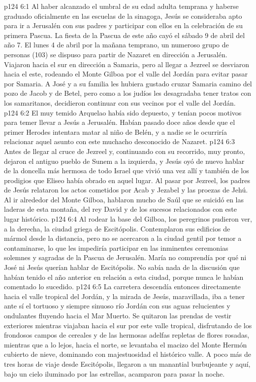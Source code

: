 \vs p124 6:1 Al haber alcanzado el umbral de su edad adulta temprana y haberse graduado oficialmente en las escuelas de la sinagoga, Jesús se consideraba apto para ir a Jerusalén con sus padres y participar con ellos en la celebración de su primera Pascua. La fiesta de la Pascua de este año cayó el sábado 9 de abril del año 7. El lunes 4 de abril por la mañana temprano, un numeroso grupo de personas (103) se dispuso para partir de Nazaret en dirección a Jerusalén. Viajaron hacia el sur en dirección a Samaria, pero al llegar a Jezreel se desviaron hacia el este, rodeando el Monte Gilboa por el valle del Jordán para evitar pasar por Samaria. A José y a su familia les hubiera gustado cruzar Samaria camino del pozo de Jacob y de Betel, pero como a los judíos les desagradaba tener tratos con los samaritanos, decidieron continuar con sus vecinos por el valle del Jordán.
\vs p124 6:2 El muy temido Arquelao había sido depuesto, y tenían pocos motivos para temer llevar a Jesús a Jerusalén. Habían pasado doce años desde que el primer Herodes intentara matar al niño de Belén, y a nadie se le ocurriría relacionar aquel asunto con este muchacho desconocido de Nazaret.
\vs p124 6:3 Antes de llegar al cruce de Jezreel y, continuando con su recorrido, muy pronto, dejaron el antiguo pueblo de Sunem a la izquierda, y Jesús oyó de nuevo hablar de la doncella más hermosa de todo Israel que vivió una vez allí y también de los prodigios que Eliseo había obrado en aquel lugar. Al pasar por Jezreel, los padres de Jesús relataron los actos cometidos por Acab y Jezabel y las proezas de Jehú. Al ir alrededor del Monte Gilboa, hablaron mucho de Saúl que se suicidó en las laderas de esta montaña, del rey David y de los sucesos relacionados con este lugar histórico.
\vs p124 6:4 Al rodear la base del Gilboa, los peregrinos pudieron ver, a la derecha, la ciudad griega de Escitópolis. Contemplaron sus edificios de mármol desde la distancia, pero no se acercaron a la ciudad gentil por temor a contaminarse, lo que les impediría participar en las inminentes ceremonias solemnes y sagradas de la Pascua de Jerusalén. María no comprendía por qué ni José ni Jesús querían hablar de Escitópolis. No sabía nada de la discusión que habían tenido el año anterior en relación a esta ciudad, porque nunca le habían comentado lo sucedido.
\vs p124 6:5 La carretera descendía entonces directamente hacia el valle tropical del Jordán, y la mirada de Jesús, maravillada, iba a tener ante sí el tortuoso y siempre sinuoso río Jordán con sus aguas relucientes y ondulantes fluyendo hacia el Mar Muerto. Se quitaron las prendas de vestir exteriores mientras viajaban hacia el sur por este valle tropical, disfrutando de los frondosos campos de cereales y de las hermosas adelfas repletas de flores rosadas, mientras que a lo lejos, hacia el norte, se levantaba el macizo del Monte Hermón cubierto de nieve, dominando con majestuosidad el histórico valle. A poco más de tres horas de viaje desde Escitópolis, llegaron a un manantial burbujeante y aquí, bajo un cielo iluminado por las estrellas, acamparon para pasar la noche.
